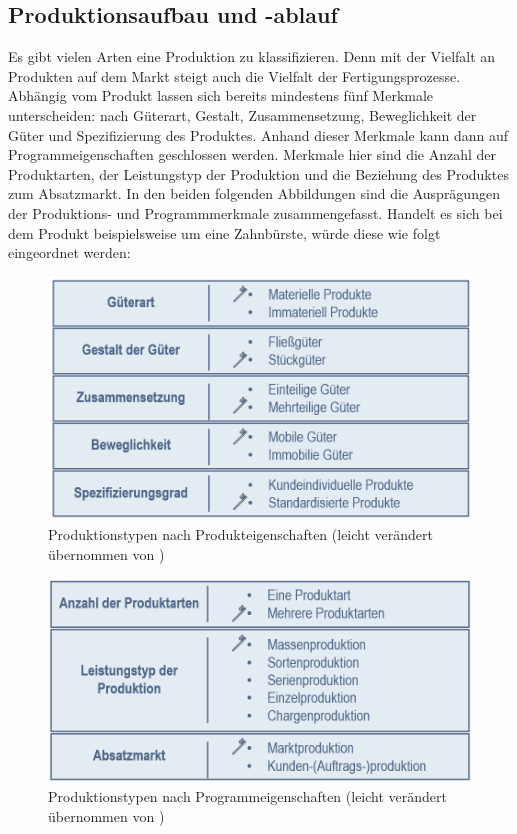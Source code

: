 \documentclass[a4paper,12pt, german]{report}
\begin{document}
\subsection{Produktionsaufbau und -ablauf}
Es gibt vielen Arten eine Produktion zu klassifizieren. Denn mit der Vielfalt an Produkten auf dem Markt steigt auch die Vielfalt der Fertigungsprozesse. Abhängig vom Produkt lassen sich bereits mindestens fünf Merkmale unterscheiden: nach Güterart, Gestalt, Zusammensetzung, Beweglichkeit der Güter und Spezifizierung des Produktes. Anhand dieser Merkmale kann dann auf Programmeigenschaften geschlossen werden. Merkmale hier sind die Anzahl der Produktarten, der Leistungstyp der Produktion und die Beziehung des Produktes zum Absatzmarkt.\cite{07} \newline 
In den beiden folgenden Abbildungen sind die Ausprägungen der Produktions- und Programmmerkmale zusammengefasst. Handelt es sich bei dem Produkt beispielsweise um eine Zahnbürste, würde diese wie folgt eingeordnet werden:
\begin{figure}
  \center
 \includegraphics[width=12cm]{images/nachProdukt.pptx.png}
  \caption[Produktionstypen nach Produkteigenschaften]{Produktionstypen nach Produkteigenschaften (leicht verändert übernommen von \cite{07})}
\end{figure}
\begin{figure}
  \center
 \includegraphics[width=12cm]{images/nachProgramm.png}
  \caption[Produktionstypen nach Programmeigenschaften]{Produktionstypen nach Programmeigenschaften (leicht verändert übernommen von \cite{07})}
\end{figure}
\end{document}
